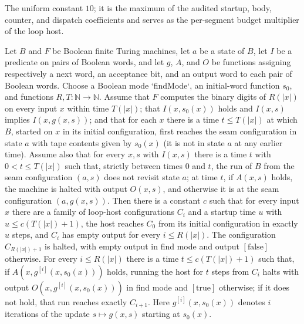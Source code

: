 \begin{definition}
\label{Turing.FinTM.loopHost_bound}
\leanok
The uniform constant $10$; it is the maximum of the audited startup, body, counter, and
dispatch coefficients and serves as the per-segment budget multiplier of the loop host.
\end{definition}

\begin{lemma}
\label{Turing.FinTM.loopHost_contracts}
\leanok
{}
Let $B$ and $F$ be Boolean finite Turing machines, let $a$ be a state of $B$, let $I$ be
a predicate on pairs of Boolean words, and let $g$, $A$, and $O$ be functions assigning
respectively a next word, an acceptance bit, and an output word to each pair of Boolean
words. Choose a Boolean mode `findMode`, an initial-word function $s_0$, and functions
$R,T:\mathbb N\to\mathbb N$. Assume that $F$ computes the binary digits of $R(|x|)$ on
every input $x$ within time $T(|x|)$; that $I(x,s_0(x))$ holds and $I(x,s)$ implies
$I(x,g(x,s))$; and that for each $x$ there is a time $t\le T(|x|)$ at which $B$, started
on $x$ in its initial configuration, first reaches the seam configuration in state $a$
with tape contents given by $s_0(x)$ (it is not in state $a$ at any earlier time).
Assume also that for every $x,s$ with $I(x,s)$ there is a time $t$ with $0<t\le T(|x|)$
such that, strictly between times $0$ and $t$, the run of $B$ from the seam
configuration $(a,s)$ does not revisit state $a$; at time $t$, if $A(x,s)$ holds, the
machine is halted with output $O(x,s)$, and otherwise it is at the seam configuration
$(a,g(x,s))$. Then there is a constant $c$ such that for every input $x$ there are a
family of loop-host configurations $C_i$ and a startup time $u$ with $u\le c(T(|x|)+1)$,
the host reaches $C_0$ from its initial configuration in exactly $u$ steps, and $C_i$
has empty output for every $i\le R(|x|)$. The configuration $C_{R(|x|)+1}$ is halted,
with empty output in find mode and output $[\mathrm{false}]$ otherwise. For every $i\le
R(|x|)$ there is a time $t\le c(T(|x|)+1)$ such that, if $A(x,g^{[i]}(x,s_0(x)))$ holds,
running the host for $t$ steps from $C_i$ halts with output $O(x,g^{[i]}(x,s_0(x)))$ in
find mode and $[\mathrm{true}]$ otherwise; if it does not hold, that run reaches exactly
$C_{i+1}$. Here $g^{[i]}(x,s_0(x))$ denotes $i$ iterations of the update $s\mapsto
g(x,s)$ starting at $s_0(x)$.
\end{lemma}

